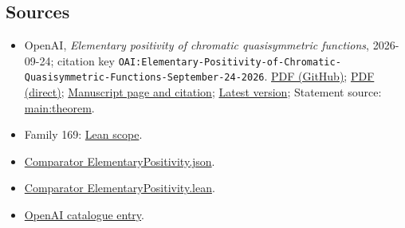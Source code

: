 \documentclass[11pt]{article}
\begin{document}
\subsection{Sources}
\begin{itemize}
\item OpenAI, \emph{Elementary positivity of chromatic quasisymmetric functions}, 2026-09-24; citation key \texttt{OAI:Elementary-Positivity-of-Chromatic-Quasisymmetric-Functions-September-24-2026}. \href{https://github.com/openai/math/blob/adc7f1241b42e322a6451854ab7e4b4c146bf78a/preprints/Elementary-Positivity-of-Chromatic-Quasisymmetric-Functions-September-24-2026/paper.pdf}{PDF (GitHub)}; \href{https://github.com/openai/math/raw/adc7f1241b42e322a6451854ab7e4b4c146bf78a/preprints/Elementary-Positivity-of-Chromatic-Quasisymmetric-Functions-September-24-2026/paper.pdf}{PDF (direct)}; \href{https://github.com/openai/math/blob/adc7f1241b42e322a6451854ab7e4b4c146bf78a/preprints/Elementary-Positivity-of-Chromatic-Quasisymmetric-Functions-September-24-2026/README.md}{Manuscript page and citation}; \href{https://github.com/openai/math/blob/main/preprints/Elementary-Positivity-of-Chromatic-Quasisymmetric-Functions-September-24-2026/paper.pdf}{Latest version}; Statement source: \href{https://github.com/openai/math/blob/adc7f1241b42e322a6451854ab7e4b4c146bf78a/preprints/Elementary-Positivity-of-Chromatic-Quasisymmetric-Functions-September-24-2026/build/sections/01-introduction.tex\#L39}{main:theorem}.
\item Family 169: \href{https://github.com/openai/math/blob/adc7f1241b42e322a6451854ab7e4b4c146bf78a/lean/docs/169.md}{Lean scope}.
\item \href{https://github.com/openai/math/blob/adc7f1241b42e322a6451854ab7e4b4c146bf78a/lean/ComparatorChallenges/ElementaryPositivity.json}{Comparator ElementaryPositivity.json}.
\item \href{https://github.com/openai/math/blob/adc7f1241b42e322a6451854ab7e4b4c146bf78a/lean/ComparatorChallenges/ElementaryPositivity.lean}{Comparator ElementaryPositivity.lean}.
\item \href{https://github.com/openai/math/blob/adc7f1241b42e322a6451854ab7e4b4c146bf78a/CONTENTS.md}{OpenAI catalogue entry}.
\end{itemize}
\end{document}
